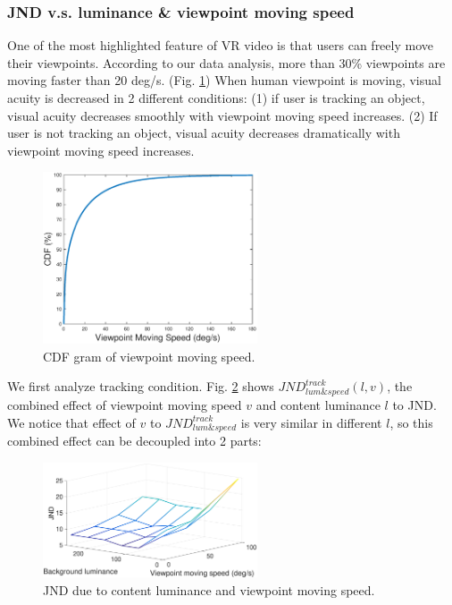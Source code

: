 \subsubsection{JND v.s. luminance \& viewpoint moving speed}

One of the most highlighted feature of VR video is that users can freely move their viewpoints. According to our data analysis, more than 30\% viewpoints are moving faster than 20 deg/s. (Fig. \ref{CDFspeed}) When human viewpoint is moving, visual acuity is decreased in 2 different conditions: (1) if user is tracking an object, visual acuity decreases smoothly with viewpoint moving speed increases. (2) If user is not tracking an object, visual acuity decreases dramatically with viewpoint moving speed increases. \cite{speed}

\begin{figure}
  \centering
  \includegraphics[width=2.5in]{images/speed_CDF.eps}
  \caption{CDF gram of viewpoint moving speed.}
  \label{CDFspeed}
  \end{figure}
  
We first analyze tracking condition. Fig. \ref{JNDspeed-lum-track} shows $JND_{lum\&speed}^{track}(l, v)$, the combined effect of viewpoint moving speed $v$ and content luminance $l$ to JND. We notice that effect of $v$ to $JND_{lum\&speed}^{track}$ is very similar in different $l$, so this combined effect can be decoupled into 2 parts:

\begin{figure}
  \centering
  \includegraphics[width=2.5in]{images/JNDspeed-lum.eps}
  \caption{JND due to content luminance and viewpoint moving speed.}
  \label{JNDspeed-lum-track}
  \end{figure}

